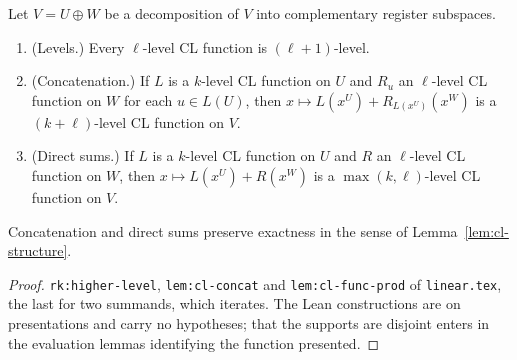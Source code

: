 \begin{lemma}
\label{lem:cl-closure}
\leanok
Let $V = U \oplus W$ be a decomposition of $V$ into complementary register subspaces.
\begin{enumerate}
\item (Levels.) Every $\ell$-level CL function is $(\ell+1)$-level.
\item (Concatenation.) If $L$ is a $k$-level CL function on $U$ and $R_u$ an $\ell$-level CL
  function on $W$ for each $u \in L(U)$, then $x \mapsto L(x^U) + R_{L(x^U)}(x^W)$ is a
  $(k+\ell)$-level CL function on $V$.
\item (Direct sums.) If $L$ is a $k$-level CL function on $U$ and $R$ an $\ell$-level CL
  function on $W$, then $x \mapsto L(x^U) + R(x^W)$ is a $\max(k,\ell)$-level CL function on
  $V$.
\end{enumerate}
Concatenation and direct sums preserve exactness in the sense of
Lemma~\ref{lem:cl-structure}.
\end{lemma}

\begin{proof}
\leanok
\texttt{rk:higher-level}, \texttt{lem:cl-concat} and \texttt{lem:cl-func-prod} of
\texttt{linear.tex}, the last for two summands, which iterates. The Lean constructions are on
presentations and carry no hypotheses; that the supports are disjoint enters in the evaluation
lemmas identifying the function presented.
\end{proof}


